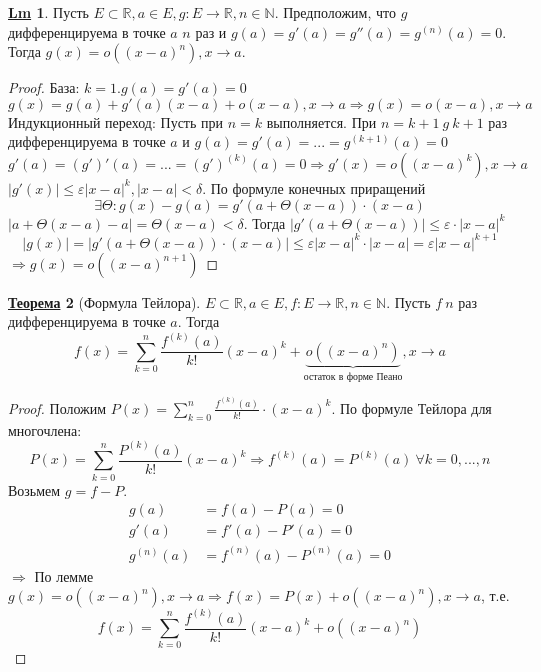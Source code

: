 \documentclass[12pt]{article}
\def\N{\mathbb{N}}       %
\def\R{\mathbb{R}}       %
\def\SO{\Rightarrow}     %
\def\Pagebreak{\pagebreak\vspace*{-1.5em}}
\theoremstyle{definition} %
\newtheorem{Thm}{\underline{Теорема}}[subsection] %
\newtheorem{Lm}[Thm]{\underline{Lm}} %
\theoremstyle{plain} %
\theoremstyle{remark} %
\begin{document}
\Pagebreak
\begin{Lm}
    Пусть $E \subset \R, a \in E, g : E \to \R, n \in \N$. Предположим, что $g$ дифференцируема в точке $a$ $n$ раз и $g(a) = g'(a) = g''(a) = g^{(n)}(a) = 0$.
    Тогда $g(x) = o((x - a)^n), x \to a$.   
\end{Lm}

\begin{proof}
    База: $k = 1. g(a) = g'(a) = 0$  
    \[g(x) = g(a) + g'(a)(x - a) + o(x - a), x \to a \SO g(x) = o(x - a), x \to a\]
    Индукционный переход: Пусть при $n = k$ выполняется. При $n = k + 1 \ g \ k + 1$ раз дифференцируема в точке $a$ и $g(a) = g'(a) = ... = g^{(k + 1)}(a) = 0$
    \[g'(a) = \left(g'\right)'(a) = ... = \left(g'\right)^{(k)}(a) = 0 \SO g'(x) = o((x - a)^k), x \to a\]
    $|g'(x)| \leqslant \varepsilon |x - a|^k, |x - a| < \delta$. По формуле конечных приращений 
    \[\exists \Theta : g(x) - g(a) = g'(a + \Theta(x - a)) \cdot (x - a)\] 
    $|a + \Theta(x - a) - a| = \Theta(x - a) < \delta$. Тогда $|g'(a + \Theta(x - a))| \leqslant \varepsilon \cdot |x - a|^k$
    \[|g(x)| = |g'(a + \Theta(x - a)) \cdot (x - a)| \leqslant \varepsilon |x - a|^k \cdot |x - a| = \varepsilon |x - a|^{k + 1}\] 
    $\SO g(x) = o \left((x - a)^{n + 1}\right)$ 
\end{proof}

\begin{Thm}[Формула Тейлора]
    $E \subset \R, a \in E, f : E \to \R, n \in \N$. Пусть $f \ n$ раз дифференцируема в точке $a$. Тогда 
    \[f(x) = \sum_{k=0}^{n} \frac{f^{(k)}(a)}{k!}(x - a)^k + \underbrace{o((x - a)^n)}_\text{остаток в форме Пеано}, x \to a\]
\end{Thm}

\begin{proof}
    Положим $P(x) = \sum_{k=0}^{n} \frac{f^{(k)}(a)}{k!} \cdot (x - a)^k$.
    По формуле Тейлора для многочлена:
    \[P(x) = \sum_{k=0}^{n} \frac{P^{(k)}(a)}{k!}(x - a)^k \SO f^{(k)}(a) = P^{(k)}(a) \ \forall k = 0, ..., n\]
    Возьмем $g = f - P$.
    \begin{align*}
        g(a) &= f(a) - P(a) = 0 \\
        g'(a) &= f'(a) - P'(a) = 0 \\
        g^{(n)}(a) &= f^{(n)}(a) - P^{(n)}(a) = 0
    \end{align*}
    $\SO$ По лемме $g(x) = o((x - a)^n), x \to a \SO f(x) = P(x) + o((x - a)^n), x \to a$, т.е.
    \[f(x) = \sum_{k=0}^{n} \frac{f^{(k)}(a)}{k!}(x - a)^k + o((x - a)^n)\]
\end{proof}
\end{document}
